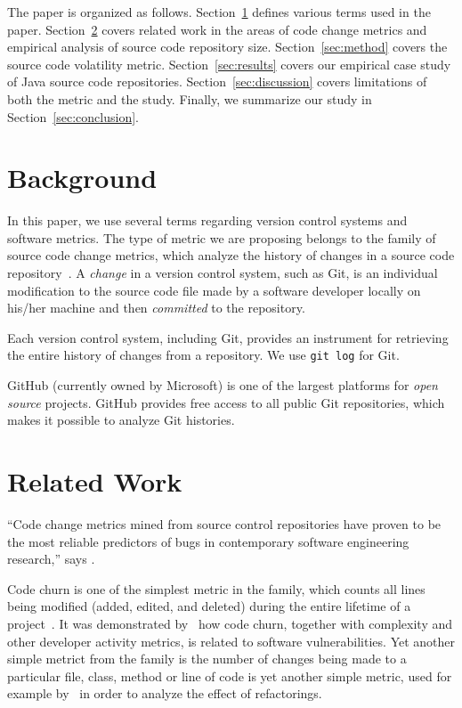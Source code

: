 \documentclass[sigconf]{acmart}
\begin{document}
The paper is organized as follows.
Section~\ref{sec:background} defines various terms used in the paper.
Section~\ref{sec:related} covers related work in the areas of code change metrics
and empirical analysis of source code repository size.
Section~\ref{sec:method} covers the source code volatility metric.
Section~\ref{sec:results} covers our empirical case study of \thetotalrepos{} Java source code repositories.
Section~\ref{sec:discussion} covers limitations of both the metric and the study.
Finally, we summarize our study in Section~\ref{sec:conclusion}.

\section{Background}
\label{sec:background}

In this paper, we use several terms regarding version control systems and
software metrics. The type of metric we are proposing belongs to the family
of source code change metrics, which analyze the history
of changes in a source code repository~\citep{fentonsoftware,choudhary2018}.
A \emph{change} in a version control system, such as Git, is an individual
modification to the source code file made by a software developer locally
on his/her machine and then \emph{committed} to the repository.

Each version control system, including Git, provides an instrument for
retrieving the entire history of changes from a repository. We use
\texttt{git log} for Git.

GitHub\texttrademark{} (currently owned by Microsoft\texttrademark{}) is
one of the largest platforms for \emph{open source} projects.
GitHub provides free access to all public Git repositories, which makes it possible
to analyze Git histories.

\section{Related Work}
\label{sec:related}

``Code change metrics mined from source control repositories have
proven to be the most reliable predictors of bugs in
contemporary software engineering research,'' says \citet{muthukumaran2015}.

Code churn is one of the simplest metric in the family, which counts
all lines being modified (added, edited, and deleted) during
the entire lifetime of a project~\citep{munson1998}. It was demonstrated
by~\citet{shin2010} how code churn, together with complexity and other
developer activity metrics, is related to software vulnerabilities.
Yet another simple metrict from the family is
the number of changes being made to a particular file, class, method
or line of code is yet another simple metric, used for example by~\citet{demeyer2000}
in order to analyze the effect of refactorings.
\end{document}
